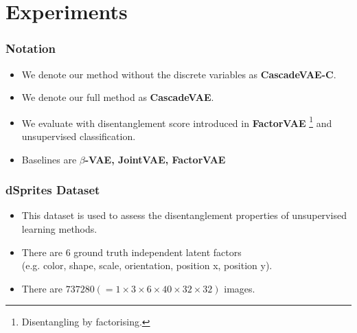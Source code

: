 \documentclass[10pt,mathserif]{beamer}
\begin{document}
\section{Experiments}

\begin{frame}
\frametitle{Notation}
\begin{itemize}\itemsep=12pt
\item We denote our method without the discrete variables as \textbf{CascadeVAE-C}.
\item We denote our full method as \textbf{CascadeVAE}. 
\item We evaluate with disentanglement score introduced in \textbf{FactorVAE} \footnote{{\color{blue}{Kim, H. and Mnih, A.}} Disentangling by factorising. {\color{gray}{ICML2018}}} and unsupervised classification.
\item Baselines are \textbf{$\beta$-VAE, JointVAE, FactorVAE}
\end{itemize}
\end{frame}

\begin{frame}
\frametitle{dSprites Dataset}
\begin{itemize}\itemsep=20pt
\item This dataset is used to assess the disentanglement properties of unsupervised learning methods.\pause
\item There are 6 ground truth independent latent factors\\
    (e.g. color, shape, scale, orientation, position x, position y).\pause
\item There are $737280(=1\times3\times6\times40\times32\times32)$ images.
\end{itemize}
\end{frame}
\end{document}
